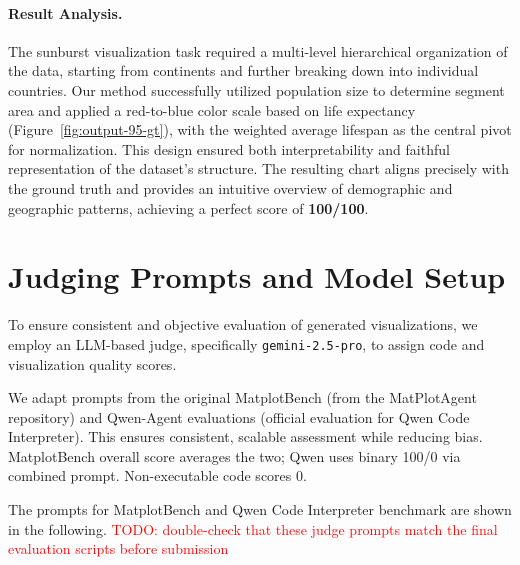 \documentclass[11pt, a4paper, logo, copyright]{googlecloud}
\newcommand{\io}[1]{\setlength{\fboxsep}{1pt}\colorbox{gray!10}{\texttt{#1}}}
\newcommand{\todo}[1]{\textcolor{red}{#1}}
\begin{document}
\paragraph{Result Analysis.}
The sunburst visualization task required a multi-level hierarchical organization of the data, 
starting from continents and further breaking down into individual countries. Our method 
successfully utilized population size to determine segment area and applied a red-to-blue 
color scale based on life expectancy (Figure~\ref{fig:output-95-gt}), with the weighted average lifespan as the central pivot 
for normalization. This design ensured both interpretability and faithful representation of 
the dataset’s structure. The resulting chart aligns precisely with the ground truth and 
provides an intuitive overview of demographic and geographic patterns, achieving a perfect 
score of \textbf{100/100}.

\section{Judging Prompts and Model Setup}\label{appendix:eval-prompts}

To ensure consistent and objective evaluation of generated visualizations, we employ an LLM-based judge, specifically \io{gemini-2.5-pro}, to assign code and visualization quality scores. 

We adapt prompts from the original MatplotBench (from the MatPlotAgent repository) and Qwen-Agent evaluations (official evaluation for Qwen Code Interpreter). This ensures consistent, scalable assessment while reducing bias.
MatplotBench overall score averages the two; Qwen uses binary 100/0 via combined prompt. Non-executable code scores 0.

The prompts for MatplotBench and Qwen Code Interpreter benchmark are shown in the following. \todo{TODO: double-check that these judge prompts match the final evaluation scripts before submission}
\end{document}
